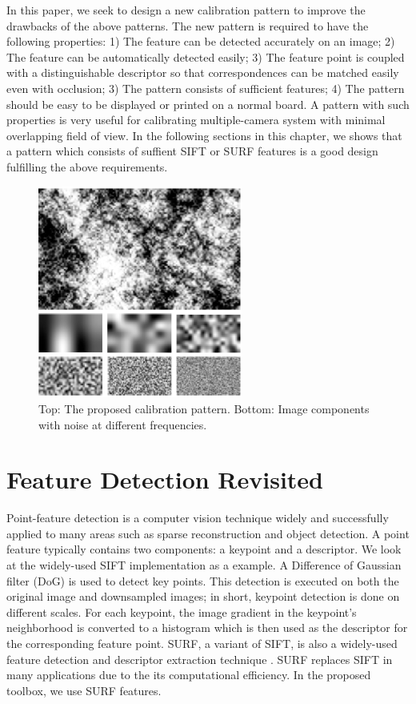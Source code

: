 \documentclass{report}
\begin{document}
In this paper, we seek to design a new calibration pattern to improve the drawbacks of the above patterns. The new pattern is required to have the following properties: 1) The feature can be detected accurately on an image; 2) The feature can be automatically detected easily; 3) The feature point is coupled with a distinguishable descriptor so that correspondences can be matched easily even with occlusion; 3) The pattern consists of sufficient features; 4) The pattern should be easy to be displayed or printed on a normal board. A pattern with such properties is very useful for calibrating multiple-camera system with minimal overlapping field of view. In the following sections in this chapter, we shows that a pattern which consists of suffient SIFT or SURF features \cite{lowe2004distinctive, bay2006surf} is a good design fulfilling the above requirements. 


\begin{figure}
\centering
\includegraphics[width=0.6\textwidth]{images/patternsample}
\caption{Top: The proposed calibration pattern. Bottom: Image components with noise at different frequencies.}
\label{PatternFig}
\end{figure}


\label{PatternSec}
\section{Feature Detection Revisited}

Point-feature detection is a computer vision technique widely and successfully applied to many areas such as sparse reconstruction and object detection. A point feature typically contains two components: a keypoint and a descriptor. We look at the widely-used SIFT implementation \cite{lowe2004distinctive} as a example. A Difference of Gaussian filter (DoG) is used to detect key points. This detection is executed on both the original image and downsampled images; in short, keypoint detection is done on different scales. For each keypoint, the image gradient in the keypoint's neighborhood is converted to a histogram which is then used as the descriptor for the corresponding feature point. SURF, a variant of SIFT, is also a widely-used feature detection and descriptor extraction technique \cite{bay2006surf}. SURF replaces SIFT in many applications due to the its computational efficiency. In the proposed toolbox, we use SURF features. 
\end{document}
